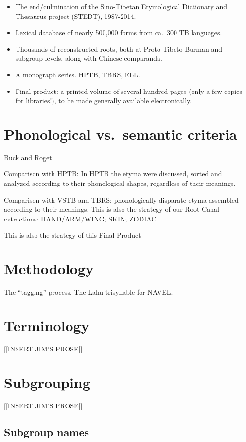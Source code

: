 \begin{itemize}
\item The end/culmination of the Sino-Tibetan Etymological Dictionary and Thesaurus project (STEDT), 1987-2014.
\item Lexical database of nearly 500,000 forms from ca.\ 300 TB languages.
\item Thousands of reconstructed roots, both at Proto-Tibeto-Burman and subgroup levels, along with Chinese comparanda.
\item A monograph series. HPTB, TBRS, ELL.
\item Final product: a printed volume of several hundred pages (only a few copies for libraries!), to be made generally available electronically.
\end{itemize}

\section{Phonological vs.\ semantic criteria}

Buck and Roget

Comparison with HPTB: In HPTB the etyma were discussed, sorted and analyzed according to their phonological shapes, regardless of their meanings.

Comparison with VSTB and TBRS: phonologically disparate etyma assembled according to their meanings. This is also the strategy of our Root Canal extractions:
HAND/ARM/WING; SKIN; ZODIAC.

This is also the strategy of this Final Product

\section{Methodology}
The “tagging” process. The Lahu trisyllable for NAVEL.

\section{Terminology}

[[INSERT JIM’S PROSE]]

\section{Subgrouping}

[[INSERT JIM’S PROSE]]

\subsection{Subgroup names}


